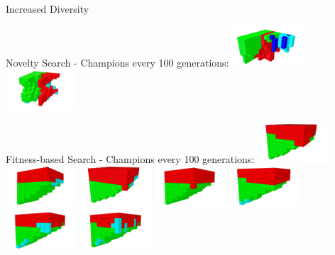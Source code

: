 \documentclass[6pt]{beamer}
\begin{document}
{\begin{frame}{Increased Diversity}
\begin{block}{Novelty Search - Champions every 100 generations:}
\includegraphics[width=0.2\textwidth]{../Figures/Robots/n_4_g_900.jpg}
\includegraphics[width=0.2\textwidth]{../Figures/Robots/n_4_g_1000.jpg}
\end{block}

\begin{block}{Fitness-based Search - Champions every 100 generations:}
\includegraphics[width=0.2\textwidth]{../Figures/Robots/f_4_g_100.jpg}
\includegraphics[width=0.2\textwidth]{../Figures/Robots/f_4_g_200.jpg}
\includegraphics[width=0.2\textwidth]{../Figures/Robots/f_4_g_300.jpg}
\includegraphics[width=0.2\textwidth]{../Figures/Robots/f_4_g_400.jpg}
\includegraphics[width=0.2\textwidth]{../Figures/Robots/f_4_g_500.jpg}\\
\includegraphics[width=0.2\textwidth]{../Figures/Robots/f_4_g_600.jpg}
\includegraphics[width=0.2\textwidth]{../Figures/Robots/f_4_g_700.jpg}

\end{block}
\end{frame}}
\end{document}

